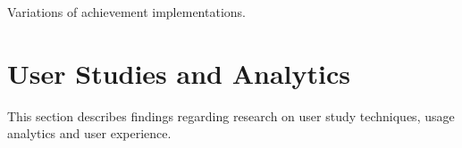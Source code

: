 Variations of achievement implementations.


\section{User Studies and Analytics}

This section describes findings regarding research on user study techniques, usage analytics and user experience.